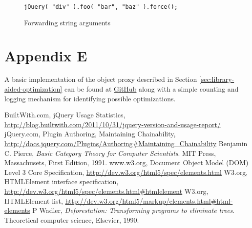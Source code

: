 \documentclass[preprint, leqno]{sigplanconf}
\begin{document}
\begin{figure}[!ht]
\small
\begin{verbatim}
jQuery( "div" ).foo( "bar", "baz" ).force();
\end{verbatim}
\nocaptionrule \caption{Forwarding string arguments}
\label{fig:args-juggle}
\end{figure}

\section{Appendix E}

A basic implementation of the object proxy described in Section \ref{sec:library-aided-optimization} can be found at \href{https://github.com/johnbender/jquery-lazy-proxy/blob/79ab61e22547169d6f392512f782df2e29362ebc/lazy.js}{GitHub} along with a simple counting and logging mechanism for identifying possible optimizations.




\begin{thebibliography}{}
\softraggedright

  BuiltWith.com,
  jQuery Usage Statistics,
  \url{http://blog.builtwith.com/2011/10/31/jquery-version-and-usage-report/}
  jQuery.com,
  Plugin Authoring,
  Maintaining Chainability,
  \url{http://docs.jquery.com/Plugins/Authoring#Maintaining_Chainability}
  Benjamin C. Pierce,
  \emph{Basic Category Theory for Computer Scientists}.
  MIT Press, Massachusets,
  First Edition,
  1991.
  www.w3.org,
  Document Object Model (DOM) Level 3 Core Specification,
  \url{http://dev.w3.org/html5/spec/elements.html}
  W3.org,
  HTMLElement interface specification,
  \url{http://dev.w3.org/html5/spec/elements.html#htmlelement}
  W3.org,
  HTMLElement list,
  \url{http://dev.w3.org/html5/markup/elements.html#html-elements}
  P Wadler,
  \emph{Deforestation: Transforming programs to eliminate trees}.
  Theoretical computer science,
  Elsevier,
  1990.

\end{thebibliography}
\end{document}
